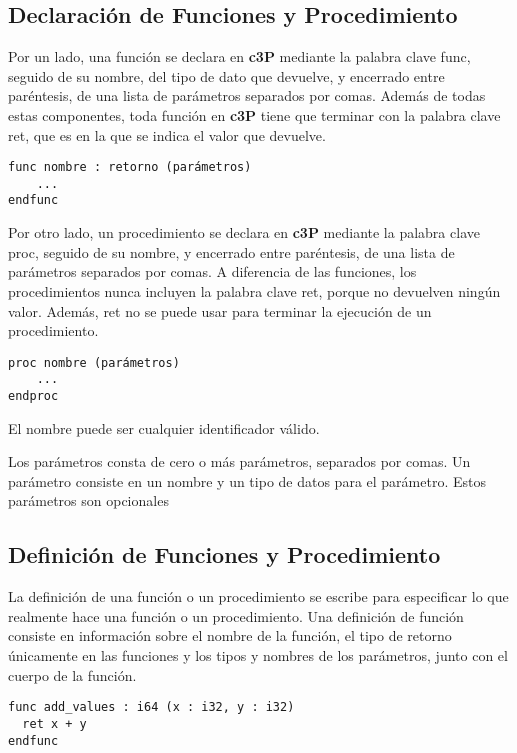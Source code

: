 \subsection{Declaración de Funciones y Procedimiento}

Por un lado, una función se declara en \textbf{c3P} mediante la palabra clave func,
seguido de su nombre, del tipo de dato que devuelve, y encerrado entre paréntesis,
de una lista de parámetros separados por comas. Además de todas estas componentes,
toda función en \textbf{c3P} tiene que terminar con la palabra clave ret, que es
en la que se indica el valor que devuelve.

\begin{verbatim}
func nombre : retorno (parámetros)
    ...
endfunc
\end{verbatim}

Por otro lado, un procedimiento se declara en \textbf{c3P} mediante la palabra clave proc,
seguido de su nombre, y encerrado entre paréntesis, de una lista de parámetros separados
por comas. A diferencia de las funciones, los procedimientos nunca incluyen la palabra
clave ret, porque no devuelven ningún valor. Además, ret no se puede usar para terminar
la ejecución de un procedimiento.

\begin{verbatim}
proc nombre (parámetros)
    ...
endproc
\end{verbatim}

El nombre puede ser cualquier identificador válido.

Los parámetros consta de cero o más parámetros, separados por comas. Un parámetro  consiste en un nombre y un tipo de datos para el parámetro. Estos parámetros son opcionales

\subsection{Definición de Funciones y Procedimiento}

La definición de una función o un procedimiento se escribe para especificar lo que realmente hace una función o un procedimiento. Una definición de función consiste en información sobre el nombre de la función, el tipo de retorno únicamente en las funciones y los tipos y nombres de los parámetros, junto con el cuerpo de la función. 

\begin{verbatim}
func add_values : i64 (x : i32, y : i32)
  ret x + y
endfunc
\end{verbatim}

